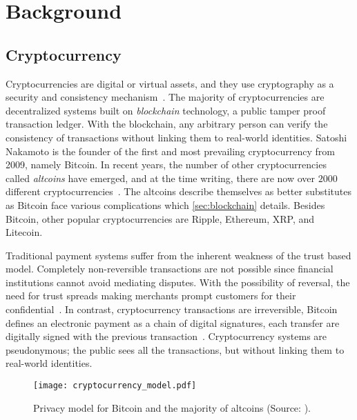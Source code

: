\chapter{Background}\label{ch:background}









\newpage\section{Cryptocurrency}\label{sec:cryptocurrencies}
Cryptocurrencies are digital or virtual assets, and they use cryptography as a security and consistency mechanism~\cite{investopedia_cryptocurrency, P&D_to_the_moon}. The majority of cryptocurrencies are decentralized systems built on \emph{blockchain} technology, a public tamper proof transaction ledger. With the blockchain, any arbitrary person can verify the consistency of transactions without linking them to real-world identities. Satoshi Nakamoto is the founder of the first and most prevailing cryptocurrency from 2009, namely Bitcoin. In recent years, the number of other cryptocurrencies called \emph{altcoins} have emerged, and at the time writing, there are now over $2000$ different cryptocurrencies~\cite{coinmarketcap}. The altcoins describe themselves as better substitutes as Bitcoin face various complications which \autoref{sec:blockchain} details. Besides Bitcoin, other popular cryptocurrencies are Ripple, Ethereum, XRP, and Litecoin.

Traditional payment systems suffer from the inherent weakness of the trust based model. Completely non-reversible transactions are not possible since financial institutions cannot avoid mediating disputes. With the possibility of reversal, the need for trust spreads making merchants prompt customers for their confidential~\cite{bitcoin}. In contrast, cryptocurrency transactions are irreversible, Bitcoin defines an electronic payment as a chain of digital signatures, each transfer are digitally signed with the previous transaction~\cite{bitcoin, ethereum_white}. Cryptocurrency systems are pseudonymous; the public sees all the transactions, but without linking them to real-world identities.

\begin{figure}[ht]
    \texttt{[image: cryptocurrency\_model.pdf]}
    \caption{Privacy model for Bitcoin and the majority of altcoins (Source: \cite{bitcoin}).}
    \label{fig:cryptocurrency_model}
\end{figure}

